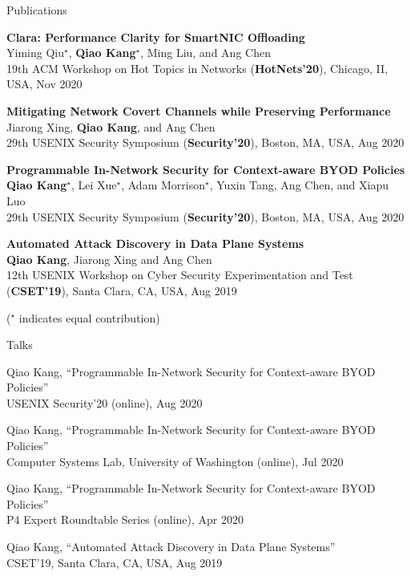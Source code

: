 \documentclass{resume} %
\begin{document}
\begin{rSection}{Publications}

\item {\bf Clara: Performance Clarity for SmartNIC Offloading}\\
Yiming Qiu$^\star$, {\bf Qiao Kang$^\star$}, Ming Liu, and Ang Chen \\
19th ACM Workshop on Hot Topics in Networks ({\bf HotNets'20}), Chicago, II, USA, Nov 2020

\item {\bf Mitigating Network Covert Channels while Preserving Performance}\\
Jiarong Xing, {\bf Qiao Kang}, and Ang Chen\\
29th USENIX Security Symposium ({\bf Security'20}), Boston, MA, USA, Aug 2020

\item {\bf Programmable In-Network Security for Context-aware BYOD Policies}\\
{\bf Qiao Kang$^\star$}, Lei Xue$^\star$, Adam Morrison$^\star$, Yuxin Tang, Ang Chen, and Xiapu Luo\\
29th USENIX Security Symposium ({\bf Security'20}), Boston, MA, USA, Aug 2020

\item {\bf Automated Attack Discovery in Data Plane Systems}\\
{\bf Qiao Kang}, Jiarong Xing and Ang Chen\\
12th USENIX Workshop on Cyber Security Experimentation and Test ({\bf CSET'19}), Santa Clara, CA, USA, Aug 2019

($^\star$ indicates equal contribution)

\end{rSection}



\begin{rSection}{Talks}

\item Qiao Kang, ``Programmable In-Network Security for Context-aware BYOD Policies'' \\
USENIX Security'20 (online), Aug 2020

\item Qiao Kang, ``Programmable In-Network Security for Context-aware BYOD Policies'' \\
Computer Systems Lab, University of Washington (online), Jul 2020

\item Qiao Kang, ``Programmable In-Network Security for Context-aware BYOD Policies'' \\
P4 Expert Roundtable Series (online), Apr 2020

\item Qiao Kang, ``Automated Attack Discovery in Data Plane Systems'' \\
CSET'19, Santa Clara, CA, USA, Aug 2019

\end{rSection}
\end{document}
